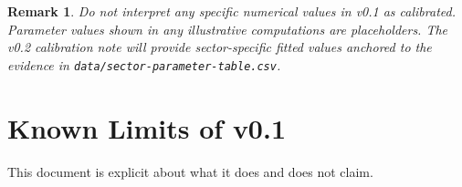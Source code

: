 \documentclass[11pt,a4paper]{article}
\newtheorem{remark}{Remark}
\begin{document}
\begin{remark}
Do not interpret any specific numerical values in v0.1 as calibrated. Parameter values shown in any illustrative computations are placeholders. The v0.2 calibration note will provide sector-specific fitted values anchored to the evidence in \texttt{data/sector-parameter-table.csv}.
\end{remark}

\section{Known Limits of v0.1}

This document is explicit about what it does and does not claim.
\end{document}
